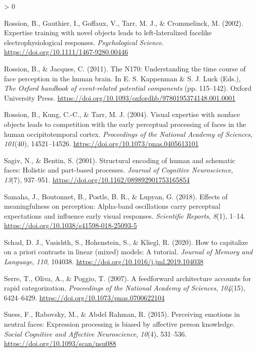 \documentclass[
  english,
  doc,12pt,twoside,floatsintext]{apa7}
\newlength{\cslhangindent}
\newenvironment{CSLReferences}[2] %
 {%
  \setlength{\parindent}{0pt}
  \ifodd #1 \everypar{\setlength{\hangindent}{\cslhangindent}}\ignorespaces\fi
  \ifnum #2 > 0
  \setlength{\parskip}{#2\baselineskip}
  \fi
 }%
 {}
\begin{document}
\begin{CSLReferences}{1}{0}
\leavevmode\hypertarget{ref-rossion2002}{}%
Rossion, B., Gauthier, I., Goffaux, V., Tarr, M. J., \& Crommelinck, M. (2002). Expertise training with novel objects leads to left-lateralized facelike electrophysiological responses. \emph{Psychological Science}. \url{https://doi.org/10.1111/1467-9280.00446}

\leavevmode\hypertarget{ref-rossion2011}{}%
Rossion, B., \& Jacques, C. (2011). The {N170}: Understanding the time course of face perception in the human brain. In E. S. Kappenman \& S. J. Luck (Eds.), \emph{The {Oxford} handbook of event-related potential components} (pp. 115--142). Oxford University Press. \url{https://doi.org/10.1093/oxfordhb/9780195374148.001.0001}

\leavevmode\hypertarget{ref-rossion2004}{}%
Rossion, B., Kung, C.-C., \& Tarr, M. J. (2004). Visual expertise with nonface objects leads to competition with the early perceptual processing of faces in the human occipitotemporal cortex. \emph{Proceedings of the National Academy of Sciences}, \emph{101}(40), 14521--14526. \url{https://doi.org/10.1073/pnas.0405613101}

\leavevmode\hypertarget{ref-sagiv2001}{}%
Sagiv, N., \& Bentin, S. (2001). Structural encoding of human and schematic faces: Holistic and part-based processes. \emph{Journal of Cognitive Neuroscience}, \emph{13}(7), 937--951. \url{https://doi.org/10.1162/089892901753165854}

\leavevmode\hypertarget{ref-samaha2018}{}%
Samaha, J., Boutonnet, B., Postle, B. R., \& Lupyan, G. (2018). Effects of meaningfulness on perception: Alpha-band oscillations carry perceptual expectations and influence early visual responses. \emph{Scientific Reports}, \emph{8}(1), 1--14. \url{https://doi.org/10.1038/s41598-018-25093-5}

\leavevmode\hypertarget{ref-schad2020}{}%
Schad, D. J., Vasishth, S., Hohenstein, S., \& Kliegl, R. (2020). How to capitalize on a priori contrasts in linear (mixed) models: A tutorial. \emph{Journal of Memory and Language}, \emph{110}, 104038. \url{https://doi.org/10.1016/j.jml.2019.104038}

\leavevmode\hypertarget{ref-serre2007}{}%
Serre, T., Oliva, A., \& Poggio, T. (2007). A feedforward architecture accounts for rapid categorization. \emph{Proceedings of the National Academy of Sciences}, \emph{104}(15), 6424--6429. \url{https://doi.org/10.1073/pnas.0700622104}

\leavevmode\hypertarget{ref-suess2015}{}%
Suess, F., Rabovsky, M., \& Abdel Rahman, R. (2015). Perceiving emotions in neutral faces: Expression processing is biased by affective person knowledge. \emph{Social Cognitive and Affective Neuroscience}, \emph{10}(4), 531--536. \url{https://doi.org/10.1093/scan/nsu088}


\end{CSLReferences}
\end{document}
